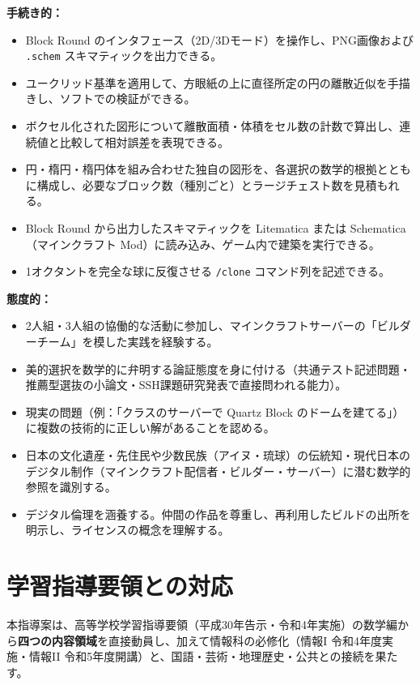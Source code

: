 \documentclass[12pt,a4paper]{scrartcl}
\newcommand{\acc}[1]{\textcolor{accent}{\textbf{#1}}}
\newcommand{\cmd}[1]{\textcolor{earth}{\texttt{\small #1}}}
\begin{document}
\textbf{手続き的：}
\begin{itemize}[leftmargin=1.3em,itemsep=0.2em,topsep=0.3em]
  \item Block Round のインタフェース（2D/3Dモード）を操作し、PNG画像および \texttt{.schem} スキマティックを出力できる。
  \item ユークリッド基準を適用して、方眼紙の上に直径所定の円の離散近似を手描きし、ソフトでの検証ができる。
  \item ボクセル化された図形について離散面積・体積をセル数の計数で算出し、連続値と比較して相対誤差を表現できる。
  \item 円・楕円・楕円体を組み合わせた独自の図形を、各選択の数学的根拠とともに構成し、必要なブロック数（種別ごと）とラージチェスト数を見積もれる。
  \item Block Round から出力したスキマティックを Litematica または Schematica（マインクラフト Mod）に読み込み、ゲーム内で建築を実行できる。
  \item 1オクタントを完全な球に反復させる \cmd{/clone} コマンド列を記述できる。
\end{itemize}

\textbf{態度的：}
\begin{itemize}[leftmargin=1.3em,itemsep=0.2em,topsep=0.3em]
  \item 2人組・3人組の協働的な活動に参加し、マインクラフトサーバーの「ビルダーチーム」を模した実践を経験する。
  \item 美的選択を数学的に弁明する論証態度を身に付ける（共通テスト記述問題・推薦型選抜の小論文・SSH課題研究発表で直接問われる能力）。
  \item 現実の問題（例：「クラスのサーバーで Quartz Block のドームを建てる」）に複数の技術的に正しい解があることを認める。
  \item 日本の文化遺産・先住民や少数民族（アイヌ・琉球）の伝統知・現代日本のデジタル制作（マインクラフト配信者・ビルダー・サーバー）に潜む数学的参照を識別する。
  \item デジタル倫理を涵養する。仲間の作品を尊重し、再利用したビルドの出所を明示し、ライセンスの概念を理解する。
\end{itemize}

\section{学習指導要領との対応}\label{sec:bncc}

本指導案は、高等学校学習指導要領（平成30年告示・令和4年実施）の数学編から\acc{四つの内容領域}を直接動員し、加えて情報科の必修化（情報I 令和4年度実施・情報II 令和5年度開講）と、国語・芸術・地理歴史・公共との接続を果たす。
\end{document}
